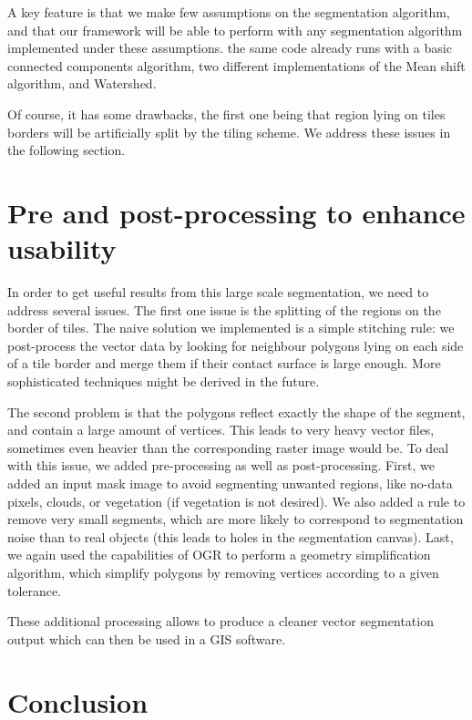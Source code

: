 \documentclass{josis}
\begin{document}
A key feature is that we make few assumptions on the segmentation
algorithm, and that our framework will be able to perform with any
segmentation algorithm implemented under these assumptions. the same
code already runs with a basic connected components algorithm, two
different implementations of the Mean shift algorithm, and Watershed.

Of course, it has some drawbacks, the first one being that region
lying on tiles borders will be artificially split by the tiling
scheme. We address these issues in the following section.

\section{Pre and post-processing to enhance usability}

In order to get useful results from this large scale segmentation, we
need to address several issues. The first one issue is the splitting
of the regions on the border of tiles. The naive solution we
implemented is a simple stitching rule: we post-process the vector
data by looking for neighbour polygons lying on each side of a tile
border and merge them if their contact surface is large enough. More
sophisticated techniques might be derived in the future.

The second problem is that the polygons reflect exactly the shape of
the segment, and contain a large amount of vertices. This leads to
very heavy vector files, sometimes even heavier than the corresponding
raster image would be. To deal with this issue, we added
pre-processing as well as post-processing. First, we added an input
mask image to avoid segmenting unwanted regions, like no-data
pixels, clouds, or vegetation (if vegetation is not desired). We also
added a rule to remove very small segments, which are more likely to
correspond to segmentation noise than to real objects (this leads to
holes in the segmentation canvas). Last, we again used the
capabilities of OGR to perform a geometry simplification algorithm,
which simplify polygons by removing vertices according to a given
tolerance.

These additional processing allows to produce a cleaner vector
segmentation output which can then be used in a GIS software.


\section{Conclusion}
\end{document}
